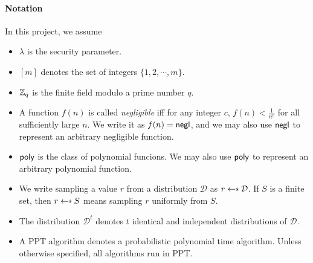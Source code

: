 \paragraph{Notation}
In this project, we assume

\begin{itemize}
	
	\item $\lambda$ is the security parameter.

	\item $[m]$ denotes the set of integers $\{1, 2, \cdots, m\}$.

	\item $\mathbb{Z}_q$ is the finite field modulo a prime number $q$.

	\item A function $f(n)$ is called \emph{negligible} iff for any integer $c$, $f(n) < \frac{1}{n^c}$ for all sufficiently large $n$. We write it as $f(n) = \mathsf{negl}$, and we may also use $\mathsf{negl}$ to represent an arbitrary negligible function.
	
	\item $\mathsf{poly}$ is the class of polynomial funcions. We may also use $\mathsf{poly}$ to represent an arbitrary polynomial function.
	
	\item We write sampling a value $r$ from a distribution $\mathcal{D}$ as $r \getsdollar \mathcal{D}$. If $S$ is a finite set, then $r \getsdollar S$ means sampling $r$ uniformly from $S$.

	\item The distribution $\mathcal{D}^t$ denotes $t$ identical and independent distributions of $\mathcal{D}$.

	\item A PPT algorithm denotes a probabilistic polynomial time algorithm. Unless otherwise specified, all algorithms run in PPT.

\end{itemize}


